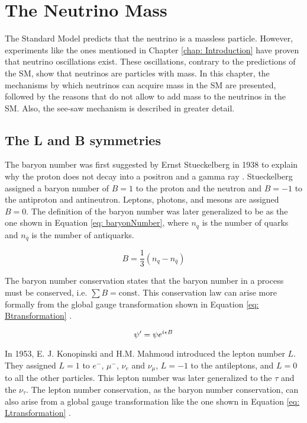 \chapter{The Neutrino Mass}\label{chapter: neutrinoMass}

The Standard Model predicts that the neutrino is a massless particle. However, experiments like the ones mentioned in Chapter \ref{chap: Introduction} have proven that neutrino oscillations exist. These oscillations, contrary to the predictions of the SM, show that neutrinos are particles with mass. In this chapter, the mechanisms by which neutrinos can acquire mass in the SM are presented, followed by the reasons that do not allow to add mass to the neutrinos in the SM. Also, the see-saw mechanism is described in greater detail. 

\section{The L and B symmetries} 

The baryon number was first suggested by Ernst Stueckelberg in 1938 to explain why the proton does not decay into a positron and a gamma ray \cite{b-l symmetry}. Stueckelberg assigned a baryon number of $B = 1$ to the proton and the neutron and $B = -1$ to the antiproton and antineutron. Leptons, photons, and mesons are assigned $B = 0$. The definition of the baryon number was later generalized to be as the one shown in Equation \ref{eq: baryonNumber}, where $n_{q}$ is the number of quarks and $n_{\bar{q}}$ is the number of antiquarks.


\begin{equation}\label{eq: baryonNumber}
B = \frac{1}{3}\left(n_{q} - n_{\bar{q}}\right)
\end{equation}

The baryon number conservation states that the baryon number in a process must be conserved, i.e. $\sum B = \text{const}$. This conservation law can arise more formally from the global gauge transformation shown in Equation \ref{eq: Btransformation} \cite{b-l symmetry}.

\begin{equation}\label{eq: Btransformation}
\psi^{\prime} = \psi e^{{i\mkern1mu} \epsilon B} 
\end{equation}

In 1953, E. J. Konopinski and H.M. Mahmoud introduced the lepton number $L$. They assigned $L = 1$ to $e^{-}$, $\mu^{-}$, $\nu_{e}$ and $\nu_{\mu}$, $L = -1$ to the antileptons, and $L = 0$ to all the other particles. This lepton number was later generalized to the $\tau$ and the $\nu_{\tau}$. The lepton number conservation, as the baryon number conservation, can also arise from a global gauge transformation like the one shown in Equation \ref{eq: Ltransformation} \cite{b-l symmetry}.

